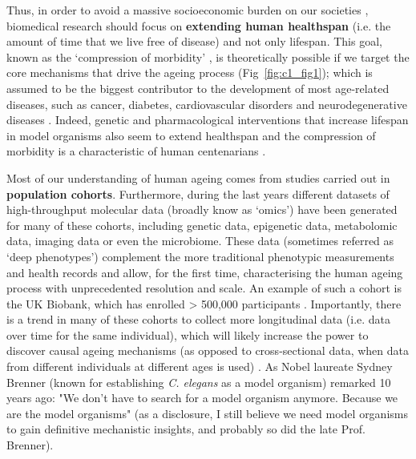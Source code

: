 Thus, in order to avoid a massive socioeconomic burden on our societies \cite{Fine2014}, biomedical research should focus on \textbf{extending human healthspan} (i.e. the amount of time that we live free of disease) and not only lifespan. This goal, known as the `compression of morbidity' \cite{Partridge2018}, is theoretically possible if we target the core mechanisms that drive the ageing process (Fig~\ref{fig:c1_fig1}); which is assumed to be the biggest contributor to the development of most age-related diseases, such as cancer, diabetes, cardiovascular disorders and neurodegenerative diseases \cite{Lopez-Otin2013}. Indeed, genetic and pharmacological interventions that increase lifespan in model organisms also seem to extend healthspan \cite{NewellStamper2018} and the compression of morbidity is a characteristic of human centenarians \cite{Feldman2012}.  

\bigskip

Most of our understanding of human ageing comes from studies carried out in \textbf{population cohorts}. Furthermore, during the last years different datasets of high-throughput molecular data (broadly know as `omics') have been generated for many of these cohorts, including genetic data, epigenetic data, metabolomic data, imaging data or even the microbiome. These data (sometimes referred as `deep phenotypes') complement the more traditional phenotypic measurements and health records and allow, for the first time, characterising the human ageing process with unprecedented resolution and scale. An example of such a cohort is the UK Biobank, which has enrolled > 500,000 participants \cite{Bahcall2018}. Importantly, there is a trend in many of these cohorts to collect more longitudinal data (i.e. data over time for the same individual), which will likely increase the power to discover causal ageing mechanisms (as opposed to cross-sectional data, when data from different individuals at different ages is used) \cite{Rahmadi2017}. As Nobel laureate Sydney Brenner (known for establishing \textit{C. elegans} as a model organism) remarked 10 years ago: "We don't have to search for a model organism anymore. Because we are the model organisms" \cite{FitzGerald2018} (as a disclosure, I still believe we need model organisms to gain definitive mechanistic insights, and probably so did the late Prof. Brenner). 

\bigskip

